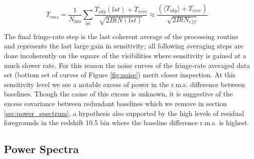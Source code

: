 \documentclass{aastex}
\begin{document}

\begin{equation}
T_{rms}  =\frac{1}{N_{\textrm{lsts}}}\sum_{\textrm{lst}} \frac{T_{sky}(lst) + T_{rcvr}}{\sqrt{2BtN(lst)}} \approx \frac{(\langle T_{sky}\rangle + T_{rcvr})}{\sqrt{2BtN_{eff}}}
\label{eq:Trms}
\end{equation}




The final fringe-rate step is the last coherent average of the processing routine and represents the last large gain in sensitivity; all following averaging steps are done incoherently on the square of the visibilities where sensitivity is gained at a much slower rate. For this reason the noise curves of the fringe-rate averaged data set (bottom set of curves of Figure \ref{fig:noise})  merit closer inspection.  At this sensitivity level we see a notable excess of power in the r.m.s. difference between baselines. Though the cause of this excess is unknown, it is suggestive of the excess covariance between redundant baselines which we remove in section \ref{sec:power_spectrum}, a hypothesis also supported by the high levels of residual foregrounds in the redshift 10.5 bin where the baseline difference r.m.s. is highest.




\subsection{Power Spectra}
\label{sec:pspecs}
\end{document}
